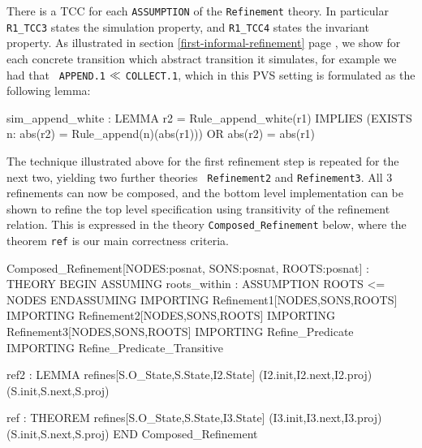 There is  a TCC for  each {\tt  ASSUMPTION}   of the {\tt  Refinement}
theory.  In particular {\tt  R1\_TCC3} states the simulation property,
and {\tt R1\_TCC4} states  the invariant property.  As illustrated  in
section                \ref{first-informal-refinement}            page
\pageref{append-refines-collect}, we show for each concrete transition
which abstract transition it simulates,  for example we had that  {\tt
  APPEND.1} $\ll$ {\tt COLLECT.1},  which in this PVS  setting is
formulated as the following lemma:

\begin{smallsession}
  sim_append_white : LEMMA
    r2 = Rule_append_white(r1) IMPLIES
      (EXISTS n: abs(r2) = Rule_append(n)(abs(r1))) OR abs(r2) = abs(r1)
\end{smallsession}
\label{pvs-append-refines-collect}

The   technique illustrated above   for  the first refinement step  is
repeated  for the   next two,   yielding   two further  theories  {\tt
  Refinement2}  and {\tt Refinement3}\@.  All 3  refinements  can now be
composed,  and the bottom level implementation  can be shown to refine
the  top  level  specification  using transitivity  of  the refinement
relation.  This is expressed  in the theory {\tt Composed\_Refinement}
below, where the theorem {\tt ref} is our main correctness criteria.

\begin{smallsession}
Composed_Refinement[NODES:posnat, SONS:posnat, ROOTS:posnat] : THEORY
BEGIN
  ASSUMING
    roots_within : ASSUMPTION ROOTS <= NODES
  ENDASSUMING
  IMPORTING Refinement1[NODES,SONS,ROOTS]
  IMPORTING Refinement2[NODES,SONS,ROOTS]
  IMPORTING Refinement3[NODES,SONS,ROOTS]
  IMPORTING Refine_Predicate
  IMPORTING Refine_Predicate_Transitive

  ref2 : LEMMA 
    refines[S.O_State,S.State,I2.State]
      (I2.init,I2.next,I2.proj)(S.init,S.next,S.proj)

  ref : THEOREM 
    refines[S.O_State,S.State,I3.State]
      (I3.init,I3.next,I3.proj)(S.init,S.next,S.proj)
END Composed_Refinement
\end{smallsession}
\label{composing-refinements}


